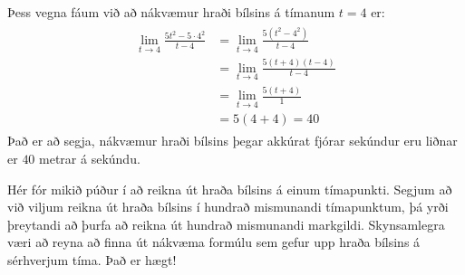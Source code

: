 \documentclass[a4paper,10pt,icelandic]{sphinxmanual}
\begin{document}
Þess vegna fáum við að nákvæmur hraði bílsins á tímanum \(t = 4\) er:
\begin{equation*}
\begin{split}\begin{aligned}
\lim_{t \to 4} \frac{5t^2−5 \cdot 4^2}{ t−4} & = \lim_{t \to 4} \frac{5(t^2−4^2)}{ t−4} \\
& = \lim_{t \to 4} \frac{5(t+4)(t−4)}{t−4} \\
& = \lim_{t \to 4} \frac{5(t+4)}{1} \\
& = 5(4+4) = 40
\end{aligned}\end{split}
\end{equation*}
Það er að segja, nákvæmur hraði bílsins þegar akkúrat fjórar sekúndur eru liðnar er \(40\) metrar á sekúndu.

Hér fór mikið púður í að reikna út hraða bílsins á einum tímapunkti.
Segjum að við viljum reikna út hraða bílsins í hundrað mismunandi tímapunktum, þá yrði þreytandi að þurfa að reikna út hundrað mismunandi markgildi.
Skynsamlegra væri að reyna að finna út nákvæma formúlu sem gefur upp hraða bílsins á sérhverjum tíma. Það er hægt!
\end{document}

